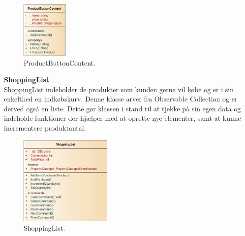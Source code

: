 \begin{figure}[H]
	\centering
	\includegraphics[width=0.2\textwidth]{Systemdesign/Frontend/pics/ProductButtonContent}
	\caption{ProductButtonContent.}
	\label{fig:PBCon}
\end{figure}

\textbf{ShoppingList} \\
ShoppingList indeholder de produkter som kunden gerne vil købe og er i sin enkelthed en indkøbskurv. Denne klasse arver fra Observable Collection og er derved også en liste. Dette gør klassen i stand til at tjekke på sin egen data og indeholde funktioner der hjælper med at oprette nye elementer, samt at kunne incrementere produktantal.

\begin{figure}[H]
	\centering
	\includegraphics[width=0.4\textwidth]{Systemdesign/Frontend/pics/ShoppingList}
	\caption{ShoppingList.}
	\label{fig:SL}
\end{figure}


